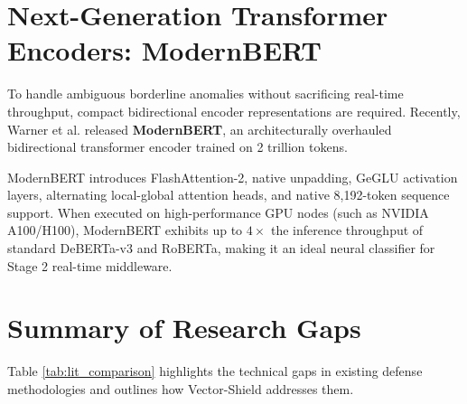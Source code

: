 \section{Next-Generation Transformer Encoders: ModernBERT}
To handle ambiguous borderline anomalies without sacrificing real-time throughput, compact bidirectional encoder representations are required. Recently, Warner et al. \cite{warner2024modernbert} released \textbf{ModernBERT}, an architecturally overhauled bidirectional transformer encoder trained on 2 trillion tokens. 

ModernBERT introduces FlashAttention-2, native unpadding, GeGLU activation layers, alternating local-global attention heads, and native 8,192-token sequence support. When executed on high-performance GPU nodes (such as NVIDIA A100/H100), ModernBERT exhibits up to $4\times$ the inference throughput of standard DeBERTa-v3 and RoBERTa, making it an ideal neural classifier for Stage 2 real-time middleware.

\section{Summary of Research Gaps}
Table \ref{tab:lit_comparison} highlights the technical gaps in existing defense methodologies and outlines how Vector-Shield addresses them.

\begin{table}[htbp]
\centering
\caption{Comparison of Vector-Shield with Existing Enterprise Guardrails}
\label{tab:lit_comparison}
\end{table}
